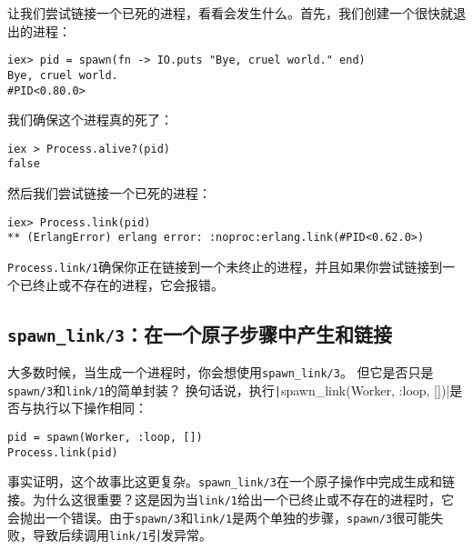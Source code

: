 让我们尝试链接一个已死的进程，看看会发生什么。首先，我们创建一个很快就退出的进程：

\begin{code}{}\begin{verbatim}
iex> pid = spawn(fn -> IO.puts "Bye, cruel world." end)
Bye, cruel world.
#PID<0.80.0>
\end{verbatim}
\end{code}

我们确保这个进程真的死了：

\begin{code}{}
\begin{verbatim}
iex > Process.alive?(pid)
false
\end{verbatim}
\end{code}

然后我们尝试链接一个已死的进程：

\begin{code}{}
\begin{verbatim}
iex> Process.link(pid)
** (ErlangError) erlang error: :noproc:erlang.link(#PID<0.62.0>)
\end{verbatim}
\end{code}

\texttt{Process.link/1}确保你正在链接到一个未终止的进程，并且如果你尝试链接到一个已终止或不存在的进程，它会报错。

\subsection{\texttt{spawn\_link/3}：在一个原子步骤中产生和链接}

大多数时候，当生成一个进程时，你会想使用\texttt{spawn\_link/3}。
但它是否只是\texttt{spawn/3}和\texttt{link/1}的简单封装？
换句话说，执行\texttt|spawn_link(Worker, :loop, [])|是否与执行以下操作相同：

\begin{code}{}
\begin{verbatim}
pid = spawn(Worker, :loop, [])
Process.link(pid)
\end{verbatim}
\end{code}

事实证明，这个故事比这更复杂。\texttt{spawn\_link/3}在一个原子操作中完成生成和链接。为什么这很重要？这是因为当\texttt{link/1}给出一个已终止或不存在的进程时，它会抛出一个错误。由于\texttt{spawn/3}和\texttt{link/1}是两个单独的步骤，\texttt{spawn/3}很可能失败，导致后续调用\texttt{link/1}引发异常。

